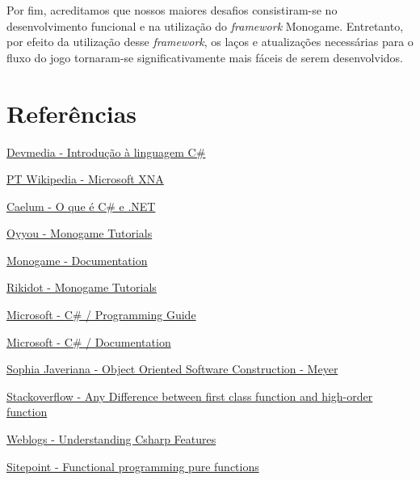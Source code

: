 \documentclass[rel_mlp]{iiufrgs}
\begin{document}
Por fim, acreditamos que nossos maiores desafios consistiram-se no desenvolvimento funcional e na utilização do \textit{framework} Monogame. Entretanto, por efeito da utilização desse \textit{framework}, os laços e atualizações necessárias para o fluxo do jogo tornaram-se significativamente mais fáceis de serem desenvolvidos.


%
\chapter{Referências}
%

\href{https://www.devmedia.com.br/introducao-a-linguagem-c/27711}{Devmedia - Introdução à linguagem C\#}

\href{https://pt.wikipedia.org/wiki/Microsoft_XNA}{PT Wikipedia - Microsoft XNA}

\href{https://www.caelum.com.br/apostila-csharp-orientacao-objetos/o-que-e-c-e-net/#2-1-um-pouco-sobre-a-historia-do-c-e-net}{Caelum - O que é C\# e .NET}

\href{https://www.youtube.com/playlist?list=PLV27bZtgVIJqoeHrQq6Mt_S1-Fvq_zzGZ}{Oyyou - Monogame Tutorials}

\href{http://www.monogame.net/documentation/?page=main}{Monogame - Documentation}

\href{http://rbwhitaker.wikidot.com/monogame-tutorials}{Rikidot - Monogame Tutorials}

\href{https://docs.microsoft.com/pt-br/dotnet/csharp/programming-guide/}{Microsoft - C\# / Programming Guide}

\href{https://docs.microsoft.com/en-us/dotnet/csharp/}{Microsoft - C\# / Documentation}

\href{https://sophia.javeriana.edu.co/~cbustaca/docencia/POO-2016-01/documentos/Object%20Oriented%20Software%20Construction-Meyer.pdf}{Sophia Javeriana - Object Oriented Software Construction - Meyer}

\href{https://stackoverflow.com/questions/10141124/any-difference-between-first-class-function-and-high-order-function}{Stackoverflow - Any Difference between first class function and high-order function}

\href{https://weblogs.asp.net/dixin/understanding-csharp-features-7-higher-order-function}{Weblogs - Understanding Csharp Features}

\href{https://www.sitepoint.com/functional-programming-pure-functions}{Sitepoint - Functional programming pure functions}

%
\end{document}
